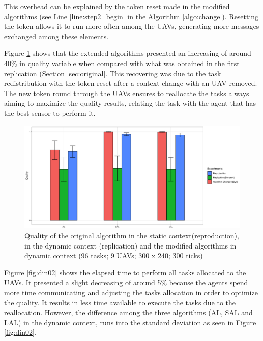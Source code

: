 This overhead can be explained by the token reset made in the modified algorithms (see Line \ref{line:step2_begin} in the Algorithm \ref{algo:change}). Resetting the token allows it to run more often among the UAVs, generating more messages exchanged among these elements.

Figure \ref{fig:fig05} shows that the extended algorithms presented an increasing of around 40\% in quality variable when compared with what was obtained in the first replication (Section \ref{sec:original}. This recovering was due to the task redistribution with the token reset after a context change with an UAV removed. The new token round through the UAVs ensures to reallocate the tasks always aiming to maximize the quality results, relating the task with the agent that has the best sensor to perform it.

\begin{figure}[h!]
	\begin{center}
		\includegraphics[scale=0.15]{fig/fig05.png}
		\caption{Quality of the original algorithm in the static context(reproduction), in the dynamic context (replication) and the modified algorithms in dynamic context (96 tasks; 9 UAVs; 300 x 240; 300 ticks)}
		\label{fig:fig05}
	\end{center}
\end{figure}

 Figure \ref{fig:din02} shows the elapsed time to perform all tasks allocated to the UAVs. It presented a slight decreasing of around 5\% because the agents spend more time communicating and adjusting the tasks allocation in order to optimize the quality. It results in less time available to execute the tasks due to the reallocation. However, the difference among the three algorithms (AL, SAL and LAL) in the dynamic context, runs into the standard deviation as seen in Figure \ref{fig:din02}.
 
